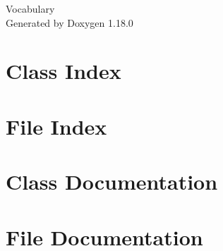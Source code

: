 \documentclass[twoside]{book}
\newcommand{\+}{\discretionary{\mbox{\scriptsize$\hookleftarrow$}}{}{}}
\newcommand{\clearemptydoublepage}{%
    \newpage{\pagestyle{empty}\cleardoublepage}%
  }
\begin{document}
  \raggedbottom
    \hypersetup{pageanchor=false,
                bookmarksnumbered=true,
                pdfencoding=unicode
               }
  \begin{titlepage}
  \vspace*{7cm}
  \begin{center}%
  {\Large Vocabulary}\\
  \vspace*{1cm}
  {\large Generated by Doxygen 1.18.0}\\
  \end{center}
  \end{titlepage}
  \clearemptydoublepage
  \tableofcontents
  \clearemptydoublepage
  \hypersetup{pageanchor=true}
\chapter{Class Index}

\chapter{File Index}

\chapter{Class Documentation}

\chapter{File Documentation}





  \backmatter
  \newpage
  \clearemptydoublepage
  \printindex
\end{document}

